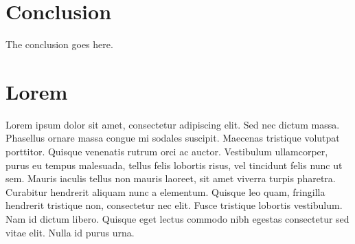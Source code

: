 \documentclass[journal]{IEEEtran}
\begin{document}
%





\section{Conclusion}
The conclusion goes here.



\section{Lorem}
Lorem ipsum dolor sit amet, consectetur adipiscing elit. Sed nec dictum massa. Phasellus ornare massa congue mi sodales suscipit. Maecenas tristique volutpat porttitor. Quisque venenatis rutrum orci ac auctor. Vestibulum ullamcorper, purus eu tempus malesuada, tellus felis lobortis risus, vel tincidunt felis nunc ut sem. Mauris iaculis tellus non mauris laoreet, sit amet viverra turpis pharetra. Curabitur hendrerit aliquam nunc a elementum. Quisque leo quam, fringilla hendrerit tristique non, consectetur nec elit. Fusce tristique lobortis vestibulum. Nam id dictum libero. Quisque eget lectus commodo nibh egestas consectetur sed vitae elit. Nulla id purus urna.
\end{document}

